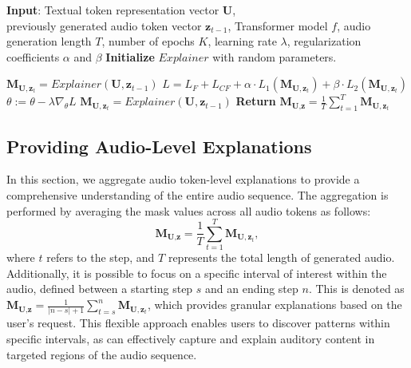 \begin{algorithm}[!t]
\caption{\mname{}}
\begin{algorithmic}
    \State \textbf{Input}: Textual token representation vector \textbf{U}, \\
    previously generated audio token vector $\textbf{z}_{t-1}$, Transformer model $f$, audio generation length $T$, number of epochs $K$, learning rate $\lambda$, regularization coefficients $\alpha$ and $\beta$ 
        \State \textbf{Initialize} $Explainer$ with random parameters.
        
                \State $\textbf{M}_{\textbf{U}, \textbf{z}_{t}} = Explainer(\textbf{U}, \textbf{z}_{t-1})$
                \State $L = L_{F} +  L_{CF} + \alpha \cdot L_1(\textbf{M}_{\textbf{U}, \textbf{z}_{t}}) + \beta \cdot L_2(\textbf{M}_{\textbf{U}, \textbf{z}_{t}})$
                \State $\theta := \theta - \lambda \nabla_\theta L$
            \EndFor
        \State $\textbf{M}_{\textbf{U}, \textbf{z}_{t}} = Explainer(\textbf{U}, \textbf{z}_{t-1})$
    \EndFor
    \State \textbf{Return} $\textbf{M}_{\textbf{U}, \textbf{z}} =  \displaystyle \frac{1}{T} \sum_{t=1}^{T} \textbf{M}_{\textbf{U}, \textbf{z}_{t}}$
\end{algorithmic}
\end{algorithm}

\subsection{Providing Audio-Level Explanations}
In this section, we aggregate audio token-level explanations to provide a comprehensive understanding of the entire audio sequence. The aggregation is performed by averaging the mask values across all audio tokens as follows:
\begin{equation}
\textbf{M}_{\textbf{U}, \textbf{z}} =  \displaystyle \frac{1}{T} \sum_{t=1}^{T} \textbf{M}_{\textbf{U}, \textbf{z}_{t}},
\label{audioexpl}
\end{equation}
\noindent where $t$ refers to the step, and $T$ represents the total length of generated audio. Additionally, it is possible to focus on a specific interval of interest within the audio, defined between a starting step $s$ and an ending step $n$. This is denoted as $\textbf{M}_{\textbf{U}, \textbf{z}} = \frac{1}{|n-s|+1} \sum_{t=s}^{n} \textbf{M}_{\textbf{U}, \textbf{z}_{t}}$, which provides granular explanations based on the user's request. This flexible approach enables users to discover patterns within specific intervals, as \mname{} can effectively capture and explain auditory content in targeted regions of the audio sequence.
